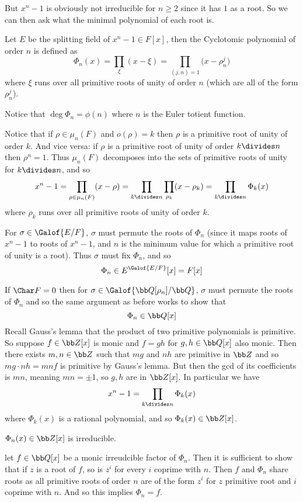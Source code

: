 But $x^n-1$ is obviously not irreducible for $n\geq2$ since it has $1$ as a root.
So we can then ask what the minimal polynomial of each root is.

\bdefn

    Let $E$ be the splitting field of $x^n-1\in F[x]$, then the {\emphcolor Cyclotomic polynomial} of order $n$ is defined as
    $$ \Phi_n(x) = \prod_\xi(x-\xi) = \prod_{(j,n)=1}\bigl(x-\rho_n^j\bigr) $$
    where $\xi$ runs over all primitive roots of unity of order $n$ (which are all of the form $\rho_n^j$).

\edefn

Notice that $\deg\Phi_n=\phi(n)$ where $n$ is the Euler totient function.

Notice that if $\rho\in\mu_n(F)$ and $o(\rho)=k$ then $\rho$ is a primitive root of unity of order $k$.
And vice versa: if $\rho$ is a primitive root of unity of order $k\divides n$ then $\rho^n=1$.
Thus $\mu_n(F)$ decomposes into the sets of primitive roots of unity for $k\divides n$, and so
$$ x^n - 1 = \prod_{\rho\in\mu_n(F)}(x-\rho) = \prod_{k\divides n}\prod_{\rho_k}(x-\rho_k) = \prod_{k\divides n}\Phi_k(x) $$
where $\rho_k$ runs over all primitive roots of unity of order $k$.

For $\sigma\in\Galof{E/F}$, $\sigma$ must permute the roots of $\Phi_n$ (since it maps roots of $x^n-1$ to roots of $x^n-1$, and $n$ is the minimum value for which a primitive root of unity is a root).
Thus $\sigma$ must fix $\Phi_n$, and so
$$ \Phi_n \in E^{\Galof{E/F}}[x] = F[x] $$

If $\Char F=0$ then for $\sigma\in\Galof{{\bb Q}[\rho_n]/{\bb Q}}$, $\sigma$ must permute the roots of $\Phi_n$ and so the same argument as before works to show that
$$ \Phi_n \in {\bb Q}[x] $$
Recall Gauss's lemma that the product of two primitive polynomials is primitive.
So suppose $f\in{\bb Z}[x]$ is monic and $f=gh$ for $g,h\in{\bb Q}[x]$ also monic.
Then there exists $m,n\in{\bb Z}$ such that $mg$ and $nh$ are primitive in ${\bb Z}$ and so $mg\cdot nh=mnf$ is primitive by Gauss's lemma.
But then the gcd of its coefficients is $mn$, meaning $mn=\pm1$, so $g,h$ are in ${\bb Z}[x]$.
In particular we have
$$ x^n - 1 = \prod_{k\divides n}\Phi_k(x) $$
where $\Phi_k(x)$ is a rational polynomial, and so $\Phi_k(x)\in{\bb Z}[x]$.

\bthrm

    $\Phi_n(x)\in{\bb Z}[x]$ is irreducible.

\ethrm

\Proof let $f\in{\bb Q}[x]$ be a monic irreudcible factor of $\Phi_n$.
Then it is sufficient to show that if $z$ is a root of $f$, so is $z^i$ for every $i$ coprime with $n$.
Then $f$ and $\Phi_n$ share roots as all primitive roots of order $n$ are of the form $z^i$ for $z$ primitive root and $i$ coprime with $n$.
And so this implies $\Phi_n=f$.

